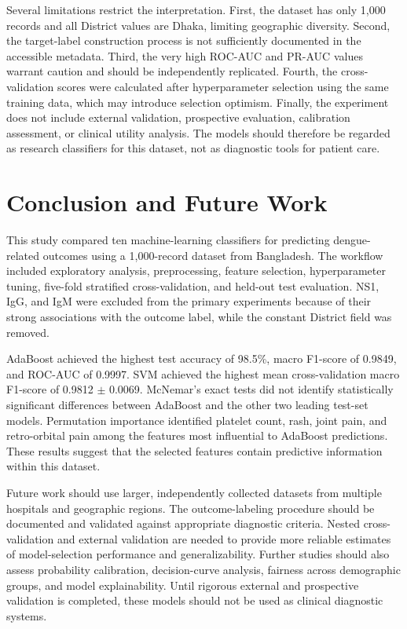 \documentclass[conference]{IEEEtran}
\begin{document}
Several limitations restrict the interpretation. First, the dataset has only 1,000 records and all District values are Dhaka, limiting geographic diversity. Second, the target-label construction process is not sufficiently documented in the accessible metadata. Third, the very high ROC-AUC and PR-AUC values warrant caution and should be independently replicated. Fourth, the cross-validation scores were calculated after hyperparameter selection using the same training data, which may introduce selection optimism. Finally, the experiment does not include external validation, prospective evaluation, calibration assessment, or clinical utility analysis. The models should therefore be regarded as research classifiers for this dataset, not as diagnostic tools for patient care.

\section{Conclusion and Future Work}
This study compared ten machine-learning classifiers for predicting dengue-related outcomes using a 1,000-record dataset from Bangladesh. The workflow included exploratory analysis, preprocessing, feature selection, hyperparameter tuning, five-fold stratified cross-validation, and held-out test evaluation. NS1, IgG, and IgM were excluded from the primary experiments because of their strong associations with the outcome label, while the constant District field was removed.

AdaBoost achieved the highest test accuracy of 98.5\%, macro F1-score of 0.9849, and ROC-AUC of 0.9997. SVM achieved the highest mean cross-validation macro F1-score of 0.9812 $\pm$ 0.0069. McNemar's exact tests did not identify statistically significant differences between AdaBoost and the other two leading test-set models. Permutation importance identified platelet count, rash, joint pain, and retro-orbital pain among the features most influential to AdaBoost predictions. These results suggest that the selected features contain predictive information within this dataset.

Future work should use larger, independently collected datasets from multiple hospitals and geographic regions. The outcome-labeling procedure should be documented and validated against appropriate diagnostic criteria. Nested cross-validation and external validation are needed to provide more reliable estimates of model-selection performance and generalizability. Further studies should also assess probability calibration, decision-curve analysis, fairness across demographic groups, and model explainability. Until rigorous external and prospective validation is completed, these models should not be used as clinical diagnostic systems.
\end{document}
